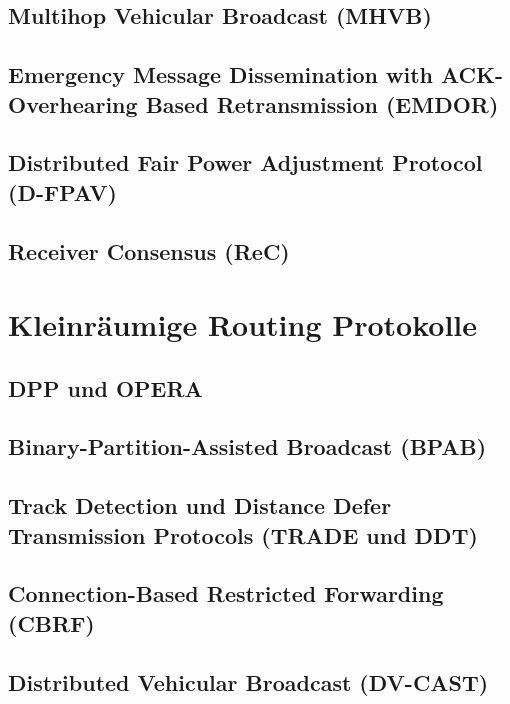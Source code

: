 \documentclass[english,runningheads,a4paper]{llncs}[2018/03/10]
\begin{document}
\subsection{Multihop Vehicular Broadcast (MHVB)}

\subsection{Emergency Message Dissemination with ACK-Overhearing Based Retransmission (EMDOR)}

\subsection{Distributed Fair Power Adjustment Protocol (D-FPAV)}

\subsection{Receiver Consensus (ReC)}

\section{Kleinräumige Routing Protokolle}
\label{sec:smallscaleprotocols}

\subsection{DPP und OPERA}

\subsection{Binary-Partition-Assisted Broadcast (BPAB)}

\subsection{Track Detection und Distance Defer Transmission Protocols (TRADE und DDT)}

\subsection{Connection-Based Restricted Forwarding (CBRF)}

\subsection{Distributed Vehicular Broadcast (DV-CAST)}
\end{document}
